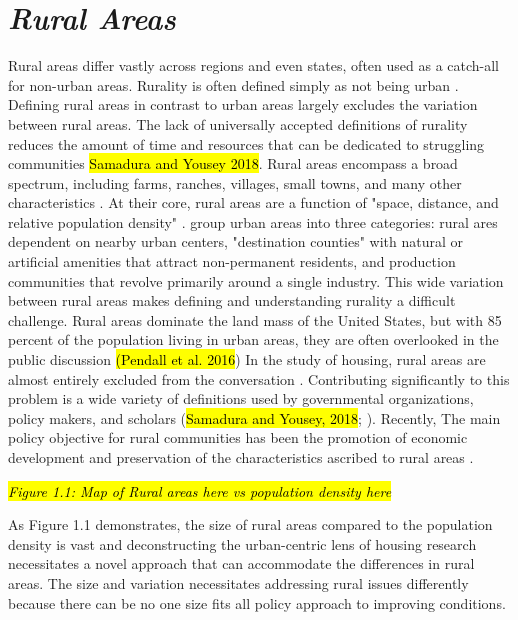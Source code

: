 \section{\textit{Rural Areas}}
Rural areas differ vastly across regions and even states, often used as a catch-all for non-urban areas. Rurality is often defined simply as not being urban \citep{robertson_rural_2007}. Defining rural areas in contrast to urban areas largely excludes the variation between rural areas. The lack of universally accepted definitions of rurality reduces the amount of time and resources that can be dedicated to struggling communities \hl{Samadura and Yousey 2018}. Rural areas encompass a broad spectrum, including farms, ranches, villages, small towns, and many other characteristics \citep{cromartie_defining_2008}. At their core, rural areas are a function of "space, distance, and relative population density" \citep[?]{castle_place_2011}.\citet{shoup_principles_nodate} group urban areas into three categories: rural ares dependent on nearby urban centers, "destination counties" with natural or artificial amenities that attract non-permanent residents, and production communities that revolve primarily around a single industry. This wide variation between rural areas makes defining and understanding rurality a difficult challenge. Rural areas dominate the land mass of the United States, but with 85 percent of the population living in urban areas, they are often overlooked in the public discussion \hl{(Pendall et al. 2016}) In the study of housing, rural areas are almost entirely excluded from the conversation \citep{gkartzios_housing_2017}. Contributing significantly to this problem is a wide variety of definitions used by governmental organizations, policy makers, and scholars (\hl{Samadura and Yousey, 2018}; \citealp{cromartie_defining_2008}). Recently, The main policy objective for rural communities has been the promotion of economic development and preservation of the characteristics ascribed to rural areas \citep{lichter_changing_2007}. 

\textit{\hl{Figure 1.1: Map of Rural areas here vs population density here}} %

As Figure 1.1 demonstrates, the size of rural areas compared to the population density is vast and deconstructing the urban-centric lens of housing research necessitates a novel approach that can accommodate the differences in rural areas. The size and variation necessitates addressing rural issues differently because there can be no one size fits all policy approach to improving conditions. 

